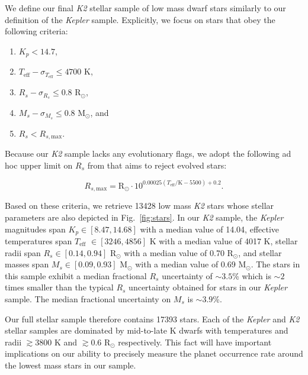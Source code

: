 \documentclass[twocolumn]{emulateapj}
\newcommand{\kepler}[1]{\emph{Kepler}#1}
\newcommand{\ktwo}[1]{\emph{K2}#1}
\newcommand{\teff}[1]{$T_{\text{eff}}$#1}
\begin{document}
We define our final \ktwo{} stellar sample of low mass dwarf stars similarly to our definition of the \kepler{} sample.
Explicitly, we focus on stars that obey the following criteria:

\begin{enumerate}
\item $K_p < 14.7$,
\item $T_{\text{eff}} - \sigma_{T_{\text{eff}}} \leq 4700$ K,
\item $R_s - \sigma_{R_s} \leq 0.8$ R$_{\odot}$,
\item $M_s - \sigma_{M_s} \leq 0.8$ M$_{\odot}$, and
\item $R_s < R_{s,\text{max}}$.
\end{enumerate}

\noindent Because our \ktwo{} sample lacks any evolutionary flags, we adopt the following ad hoc upper limit on $R_s$
from \cite{fulton17} that aims to reject evolved stars:

\begin{equation}
  R_{s,\text{max}} = \text{R}_{\odot} \cdot 10^{0.00025(T_{\text{eff}}/\text{K}-5500)+0.2}.
\end{equation}

\noindent Based on these criteria, we retrieve 13428 low mass \ktwo{} stars whose
stellar parameters are also depicted in Fig.~\ref{fig:stars}.
In our \ktwo{} sample, the \kepler{} magnitudes span $K_p \in [8.47, 14.68]$ with a median value of 14.04,
effective temperatures span \teff{} $\in [3246, 4856]$ K with a median value of 4017 K,
stellar radii span $R_s \in [0.14, 0.94]$ R$_{\odot}$ with a median value of 0.70 R$_{\odot}$, and
stellar masses span $M_s \in [0.09, 0.93]$ M$_{\odot}$ with a median value of 0.69 M$_{\odot}$.
The stars in this sample exhibit a median fractional $R_s$ uncertainty of $\sim 3.5$\% which is $\sim 2$
times smaller than the typical $R_s$ uncertainty obtained for stars in our \kepler{} sample.
The median fractional uncertainty on $M_s$ is $\sim 3.9$\%.

Our full stellar sample therefore contains 17393 stars.
Each of the \kepler{} and \ktwo{} stellar samples are dominated by mid-to-late K dwarfs
with temperatures and radii $\gtrsim 3800$ K and $\gtrsim 0.6$ R$_{\odot}$ respectively. This
fact will have important implications on our ability to precisely measure the planet occurrence
rate around the lowest mass stars in our sample.
\end{document}
